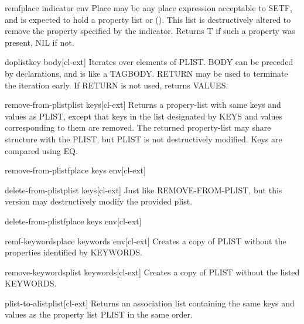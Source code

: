 \documentclass[10pt,english]{book}
\begin{document}
\begin{macro}{remf}{place indicator \env env}
  Place may be any place expression acceptable to SETF, and is expected
  to hold a property list or (). This list is destructively altered to
  remove the property specified by the indicator. Returns T if such a
  property was present, NIL if not.
\end{macro}

\begin{macro}{doplist}{key \body body}[cl-ext]
  Iterates over elements of PLIST. BODY can be preceded by
declarations, and is like a TAGBODY. RETURN may be used to terminate
the iteration early. If RETURN is not used, returns VALUES.
\end{macro}

\begin{function}{remove-from-plist}{plist \rest keys}[cl-ext]
  Returns a propery-list with same keys and values as PLIST, except that keys
in the list designated by KEYS and values corresponding to them are removed.
The returned property-list may share structure with the PLIST, but PLIST is
not destructively modified. Keys are compared using EQ.
\end{function}

\begin{macro}{remove-from-plistf}{place \rest keys \env env}[cl-ext]
  
\end{macro}

\begin{function}{delete-from-plist}{plist \rest keys}[cl-ext]
  Just like REMOVE-FROM-PLIST, but this version may destructively modify the
provided plist.
\end{function}

\begin{macro}{delete-from-plistf}{place \rest keys \env env}[cl-ext]
  
\end{macro}

\begin{macro}{remf-keywords}{place \rest keywords \env env}[cl-ext]
  Creates a copy of PLIST without the properties identified by KEYWORDS.
\end{macro}

\begin{function}{remove-keywords}{plist \rest keywords}[cl-ext]
  Creates a copy of PLIST without the listed KEYWORDS.
\end{function}

\begin{function}{plist-to-alist}{plist}[cl-ext]
  Returns an association list containing the same keys and values as the
property list PLIST in the same order.
\end{function}
\end{document}
